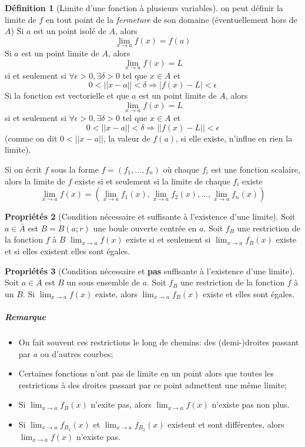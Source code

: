 \documentclass[11pt,a4paper]{article}
\theoremstyle{definition}
\newtheorem{mydef}{Définition}%
\newtheorem{myprop}[mydef]{Propriétés}
\begin{document}
\begin{mydef}[Limite d'une fonction à plusieurs variables]
	on peut définir la limite de $f$ en tout point de la \emph{fermeture} de son domaine (éventuellement hors de $A$)
	Si $a$ est un point isolé de $A$, alors
	\[ \lim_{x \to a} f(x) = f(a) \]
	Si $a$ est un point limite de $A$, alors
	\[ \lim_{x \to a} f(x) = L \]
	si et seulement si $\forall \epsilon >0, \exists \delta > 0$ tel que $x \in A$ et
	\[ 0 < || x - a || < \delta \Rightarrow |f(x) - L| < \epsilon \]
	Si la fonction est vectorielle et que $a$ est un point limite de $A$, alors
	\[ \lim_{x \to a} f(x) = L \]
	si et seulement si $\forall \epsilon >0, \exists \delta > 0$ tel que $x \in A$ et
	\[ 0 < || x - a || < \delta \Rightarrow ||f(x) - L|| < \epsilon \]
	(comme on dit $0 < ||x - a||$, la valeur de $f(a)$, si elle existe, n'influe en rien la limite).

	Si on écrit $f$ sous la forme $f = (f_1 , \dots , f_n)$ où chaque $f_i$ est une fonction scalaire, alors la limite de $f$ existe si et seulement si la limite de chaque $f_i$ existe
	\[ \lim_{x \to a} f(x) = \left( \lim_{x \to a} f_1(x), \lim_{x \to a} f_2(x), \dots , \lim_{x \to a} f_n(x) \right) \]
\end{mydef}

\begin{myprop}[Condition nécessaire et suffisante à l'existence d'une limite]
	Soit $a \in \bar{A}$ est $B = B(a; r)$ une boule ouverte centrée en $a$.
	Soit $f_B$ une restriction de la fonction $f$ à $B$
	\( \lim_{x \to a}f(x) \)
	existe si et seulement si
	\( \lim_{x \to a}f_B(x) \)
	existe et si elles existent elles sont égales.
\end{myprop}

\begin{myprop}[Condition nécessaire et \textbf{pas} suffisante à l'existence d'une limite]
	\label{prop:path}
	Soit $a \in \bar{A}$ est $B$ un sous ensemble de $a$.
	Soit $f_B$ une restriction de la fonction $f$ à un $B$.
	Si
	\( \lim_{x \to a}f(x) \)
	existe, alors
	\( \lim_{x \to a}f_B(x) \)
	existe et elles sont égales.
	\subparagraph{Remarque}
	\begin{itemize}
		\item On fait souvent ces restrictions le long de chemins: des (demi-)droites passant par $a$ ou d'autres courbes;
		\item Certaines fonctions n'ont pas de limite en un point alors que toutes les restrictions à des droites passant par
			ce point admettent une même limite;
		\item Si $\lim_{x \to a}f_B(x)$ n'exite pas, alors $\lim_{x \to a} f(x)$ n'existe pas non plus.
		\item Si $\lim_{x \to a}f_{B_1}(x)$ et $\lim_{x \to a}f_{B_2}(x)$ existent et sont différentes, alors
			$\lim_{x \to a} f(x)$ n'existe pas.
	\end{itemize}
\end{myprop}
\end{document}
